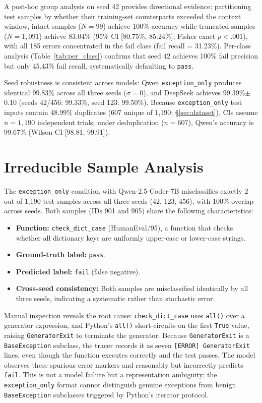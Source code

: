 A post-hoc group analysis on seed 42 provides directional evidence: partitioning test samples by whether their training-set counterparts exceeded the context window, intact samples ($N{=}99$) achieve 100\% accuracy while truncated samples ($N{=}1{,}091$) achieve 83.04\% (95\% CI [80.75\%, 85.24\%]; Fisher exact $p{<}.001$), with all 185 errors concentrated in the fail class (fail recall = 31.23\%).
Per-class analysis (Table~\ref{tab:per_class}) confirms that seed 42 achieves 100\% fail precision but only 45.43\% fail recall, systematically defaulting to \texttt{pass}.

Seed robustness is consistent across models: Qwen \texttt{exception\_only} produces identical 99.83\% across all three seeds ($\sigma{=}0$), and DeepSeek achieves 99.39\%$\pm$0.10 (seeds 42/456: 99.33\%, seed 123: 99.50\%).
Because \texttt{exception\_only} test inputs contain 48.99\% duplicates (607 unique of 1,190; \S\ref{sec:dataset}), CIs assume $n{=}1{,}190$ independent trials; under deduplication ($n{=}607$), Qwen's accuracy is 99.67\% (Wilson CI [98.81, 99.91]).

\section{Irreducible Sample Analysis}
\label{sec:irreducible}

The \texttt{exception\_only} condition with Qwen-2.5-Coder-7B misclassifies exactly 2 out of 1,190 test samples across all three seeds (42, 123, 456), with 100\% overlap across seeds.
Both samples (IDs 901 and 905) share the following characteristics:

\begin{itemize}
\item \textbf{Function:} \texttt{check\_dict\_case} (HumanEval/95), a function that checks whether all dictionary keys are uniformly upper-case or lower-case strings.
\item \textbf{Ground-truth label:} \texttt{pass}.
\item \textbf{Predicted label:} \texttt{fail} (false negative).
\item \textbf{Cross-seed consistency:} Both samples are misclassified identically by all three seeds, indicating a systematic rather than stochastic error.
\end{itemize}

Manual inspection reveals the root cause: \texttt{check\_dict\_case} uses \texttt{all()} over a generator expression, and Python's \texttt{all()} short-circuits on the first \texttt{True} value, raising \texttt{GeneratorExit} to terminate the generator.
Because \texttt{GeneratorExit} is a \texttt{BaseException} subclass, the tracer records it as seven \texttt{[ERROR] GeneratorExit} lines, even though the function executes correctly and the test passes.
The model observes these spurious error markers and reasonably but incorrectly predicts \texttt{fail}.
This is not a model failure but a representation ambiguity: the \texttt{exception\_only} format cannot distinguish genuine exceptions from benign \texttt{BaseException} subclasses triggered by Python's iterator protocol.

